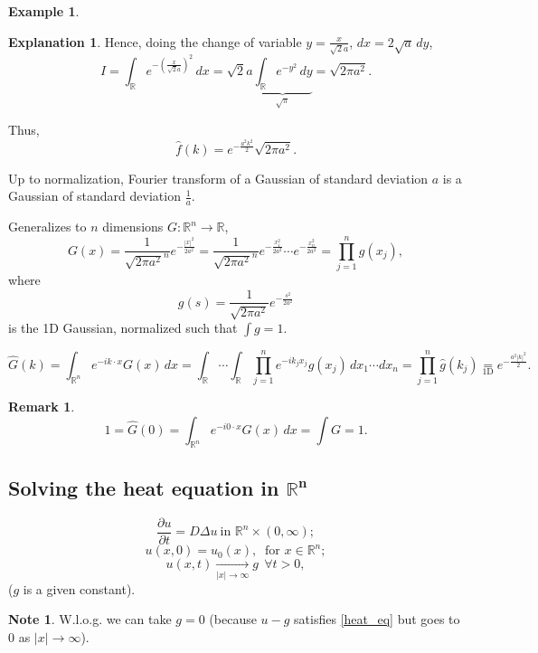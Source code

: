 \documentclass[12pt]{article}
\theoremstyle{definition}
\newtheorem*{remark}{Remark}
\newtheorem*{note}{Note}
\newtheorem{explanation}{Explanation}
\newtheorem*{example*}{Example}
\begin{document}
\begin{example*}
\begin{explanation}
Hence, doing the change of variable $y=\frac x{\sqrt2a}$, $dx=2\sqrt a\,dy$,
\[I=\int_\mathbb Re^{-\left(\frac x{\sqrt2a}\right)^2}\,dx=\sqrt2a\underbrace{\int_\mathbb Re^{-y^2}\,dy}_{\sqrt\pi}=\sqrt{2\pi a^2}.\]

Thus,
\[\hat f(k)=e^{-\frac{a^2k^2}2}\sqrt{2\pi a^2}.\]
\end{explanation}

Up to normalization, Fourier transform of a Gaussian of standard deviation $a$ is a Gaussian of standard deviation $\frac1a$.

Generalizes to $n$ dimensions $G:\mathbb R^n\rightarrow\mathbb R$,
\[G(x)=\frac1{\sqrt{2\pi a^2}^n}e^{-\frac{|x|^2}{2a^2}}=\frac1{\sqrt{2\pi a^2}^n}e^{-\frac{x_1^2}{2a^2}}\cdots e^{-\frac{x_n^2}{2a^2}}=\prod_{j=1}^ng(x_j),\]
where
\[g(s)=\frac1{\sqrt{2\pi a^2}}e^{-\frac{s^2}{2a^2}}\]
is the 1D Gaussian, normalized such that $\int g=1$.

\[\widehat G(k)=\int_{\mathbb R^n}e^{-ik\cdot x}G(x)\,dx=\int_\mathbb R\cdots\int_\mathbb R\prod_{j=1}^ne^{-ik_jx_j}g(x_j)\,dx_1\cdots dx_n=\prod_{j=1}^n\hat g(k_j)\underset{\text{1D}}=e^{-\frac{a^2|k|^2}2}.\]

\begin{remark}
\[1=\widehat G(0)=\int_{\mathbb R^n}e^{-i0\cdot x}G(x)\,dx=\int G=1.\]
\end{remark}
\end{example*}

\subsection[Solving the heat equation in \texorpdfstring{$\mathbb R^n$}{R\^{}n}]{Solving the heat equation in \texorpdfstring{$\boldsymbol{\mathbb R^n}$}{R\^{}n}}
\begin{equation}\tag{H}\label{heat_eq}
\frac{\partial u}{\partial t}=D\Delta u\ \text{
in }\mathbb R^n\times(0,\infty);
\end{equation}
\begin{equation}\tag{IC}\label{ini_con_heat}
u(x,0)=u_0(x),\ \text{ for }x\in\mathbb R^n;
\end{equation}
\begin{equation}\tag{BC}\label{boun_con_heat}
u(x,t)\xrightarrow[|x|\to\infty]{}g\ \ \forall t>0,
\end{equation}
($g$ is a given constant).

\begin{note}
W.l.o.g. we can take $g=0$ (because $u-g$ satisfies \eqref{heat_eq} but goes to $0$ as $|x|\to\infty$).
\end{note}
\end{document}
